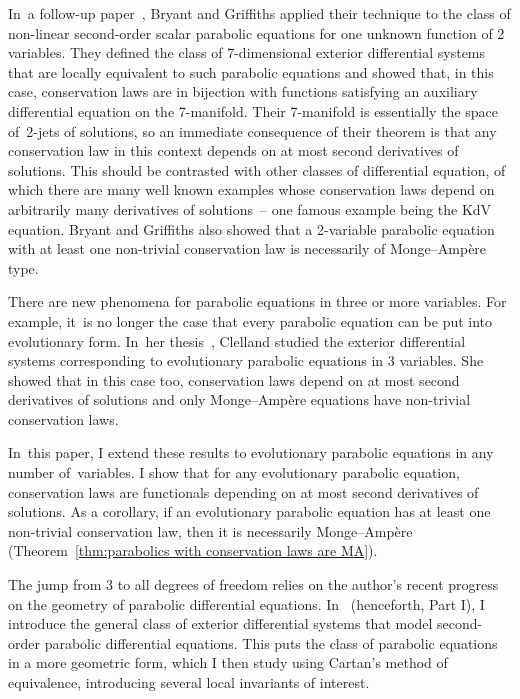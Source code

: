\documentclass[pdftex]{sigma}
\numberwithin{equation}{section}
\begin{document}
In~a follow-up paper~\cite{Characteristic_Cohomology_II}, Bryant and Griffiths applied their technique to the class of non-linear second-order scalar parabolic equations for one unknown function of 2 variables. They defined the class of 7-dimensional exterior differential systems that are locally equivalent to such parabolic equations and showed that, in this case, conservation laws are in bijection with functions satisfying an auxiliary differential equation on the 7-manifold. Their 7-manifold is essentially the space of~2-jets of solutions, so an immediate consequence of their theorem is that any conservation law in this context depends on at most second derivatives of solutions. This should be contrasted with other classes of differential equation, of which there are many well known examples whose conservation laws depend on arbitrarily many derivatives of solutions~-- one famous example being the KdV equation. Bryant and Griffiths also showed that a 2-variable parabolic equation with at least one non-trivial conservation law is necessarily of Monge--Amp\`ere type.

There are new phenomena for parabolic equations in three or more variables. For example, it~is no longer the case that every parabolic equation can be put into evolutionary form. In~her thesis~\cite{Clelland_Thesis}, Clelland studied the exterior differential systems corresponding to evolutionary parabolic equations in 3 variables. She showed that in this case too, conservation laws depend on at most second derivatives of solutions and only Monge--Amp\`ere equations have non-trivial conservation laws.

In~this paper, I extend these results to evolutionary parabolic equations in any number of~variables. I show that for any evolutionary parabolic equation, conservation laws are functionals depending on at most second derivatives of solutions. As a corollary, if an evolutionary parabolic equation has at least one non-trivial conservation law, then it is necessarily Monge--Amp\`ere (Theorem~\ref{thm:parabolics with conservation laws are MA}).

The jump from 3 to all degrees of freedom relies on the author's recent progress on the geometry of parabolic differential equations.
In~\cite{McMillan:ParabolicsI} (henceforth, Part I), I introduce the general class of exterior differential systems that model second-order parabolic differential equations.
This puts the class of parabolic equations in a more geometric form, which I then study using Cartan's method of equivalence, introducing several local invariants of interest.
\end{document}
